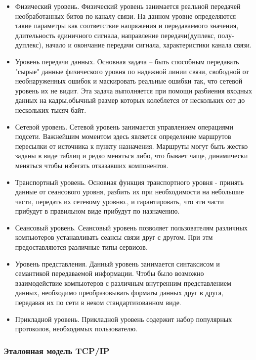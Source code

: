     \begin{itemize}
        \item Физический уровень. Физический уровень занимается реальной передачей необработанных битов по каналу связи. На данном уровне определяются такие параметры как соответствие напряжения и передаваемого значения, длительность единичного сигнала, направление передачи(дуплекс, полу-дуплекс), начало и окончание передачи сигнала, характеристики канала связи.
        \item Уровень передачи данных. Основная задача -- быть способным передавать "сырые" данные физического уровня по надежной линии связи, свободной от необнаруженных ошибок и маскировать реальные ошибки так, что сетевой уровень их не видит. Эта задача выполняется при помощи разбиения входных данных на кадры,обычный размер которых колеблется от нескольких сот до нескольких тысяч байт.
        \item Сетевой уровень. Сетевой уровень занимается управлением операциями подсети. Важнейшим моментом здесь является определение маршрутов пересылки от источника к пункту назначения. Маршруты могут быть жестко заданы в виде таблиц и редко меняться либо, что бывает чаще, динамически меняться чтобы избегать отказавших компонентов.
        \item Транспортный уровень. Основная функция транспортного уровня - принять данные от сеансового уровня, разбить их при необходимости на небольшие части, передать их сетевому уровню., и гарантировать, что эти части прибудут в правильном виде прибудут по назначению.
        \item Сеансовый уровень. Сеансовый уровень позволяет пользователям различных компьютеров устанавливать сеансы связи друг с другом. При этм предоставляются различные типы сервисов.
        \item Уровень представления. Данный уровень занимается синтаксисом и семантикой передаваемой информации. Чтобы было возможно взаимодействие компьютеров с различным внутренним представлением данных, необходимо преобразовывать форматы данных друг в друга, передавая их по сети в неком стандартизованном виде.
        \item Прикладной уровень. Прикладной уровень содержит набор популярных протоколов, необходимых пользователю.
    \end{itemize}

\subsubsection{Эталонная модель TCP/IP }

